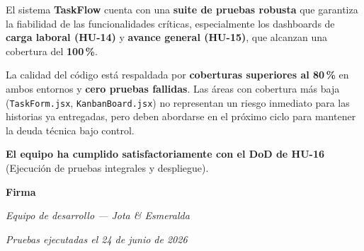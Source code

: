 \documentclass[12pt, a4paper]{article}
\begin{document}
\begin{mdframed}[
  backgroundcolor=lightgreen,
  linecolor=accentgreen,
  linewidth=1.5pt,
  innerleftmargin=14pt, innerrightmargin=14pt,
  innertopmargin=12pt, innerbottommargin=12pt
]
El sistema \textbf{TaskFlow} cuenta con una \textbf{suite de pruebas robusta} que
garantiza la fiabilidad de las funcionalidades críticas, especialmente los dashboards
de \textbf{carga laboral (HU-14)} y \textbf{avance general (HU-15)}, que alcanzan
una cobertura del \textbf{100\,\%}.

La calidad del código está respaldada por \textbf{coberturas superiores al 80\,\%}
en ambos entornos y \textbf{cero pruebas fallidas}. Las áreas con cobertura más baja
(\texttt{TaskForm.jsx}, \texttt{KanbanBoard.jsx}) no representan un riesgo inmediato
para las historias ya entregadas, pero deben abordarse en el próximo ciclo para
mantener la deuda técnica bajo control.

\textbf{El equipo ha cumplido satisfactoriamente con el DoD de HU-16}
(Ejecución de pruebas integrales y despliegue).
\end{mdframed}

\vspace{2em}

\begin{mdframed}[
  backgroundcolor=sectionbg,
  linecolor=bordercolor,
  linewidth=1pt,
  innerleftmargin=14pt, innerrightmargin=14pt,
  innertopmargin=10pt, innerbottommargin=10pt
]
\textbf{Firma}\par\vspace{0.4em}
\textit{Equipo de desarrollo --- Jota \& Esmeralda}\par
\textit{Pruebas ejecutadas el 24 de junio de 2026}
\end{mdframed}
\end{document}
